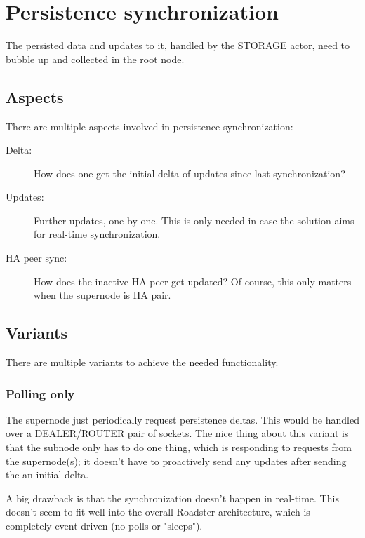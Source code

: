 \section{Persistence synchronization}\label{sec:approach:psync}
The persisted data and updates to it, handled by the STORAGE actor, need to
bubble up and collected in the root node.

\subsection{Aspects}
There are multiple aspects involved in persistence synchronization:

\begin{description}
	\item [Delta:]
		How does one get the initial delta of updates since last
		synchronization?

	\item [Updates:]
		Further updates, one-by-one. This is only needed in
		case the solution aims for real-time synchronization.

	\item [HA peer sync:]
		How does the inactive HA peer get updated? Of
		course, this only matters when the supernode is HA pair.
\end{description}

\subsection{Variants}
There are multiple variants to achieve the needed functionality.

\subsubsection{Polling only}
The supernode just periodically request persistence
deltas. This would be handled over a DEALER/ROUTER pair of sockets. The nice
thing about this variant is that the subnode only has to do one thing, which is
responding to requests from the supernode(s); it doesn't have to proactively
send any updates after sending the an initial delta.

A big drawback is that the synchronization doesn't happen in real-time. This
doesn't seem to fit well into the overall Roadster architecture, which is
completely event-driven (no polls or "sleeps").

